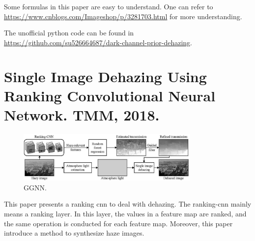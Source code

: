 \documentclass[10pt,onecolumn]{book}
\begin{document}
Some formulas in this paper are easy to understand. One can refer to \url{https://www.cnblogs.com/Imageshop/p/3281703.html} for more understanding. 

The unofficial python code can be found in \url{https://github.com/su526664687/dark-channel-prior-dehazing}.

\section{Single Image Dehazing Using Ranking Convolutional Neural Network. TMM, 2018.}
\begin{figure}[h]
\centering
\includegraphics[width=0.8\textwidth]{figures_paper_reading/Single_Image_Dehazing_Using_Ranking_Convolutional_Neural_Network.png}
\caption{GGNN.}
\label{fig}
\end{figure}

This paper presents a ranking cnn to deal with dehazing. The ranking-cnn mainly means a ranking layer. In this layer, the values in a feature map are ranked, and the same operation is conducted for each feature map. Moreover, this paper introduce a method to synthesize haze images.

~\cite{su2019for}

{\small


}
\end{document}
